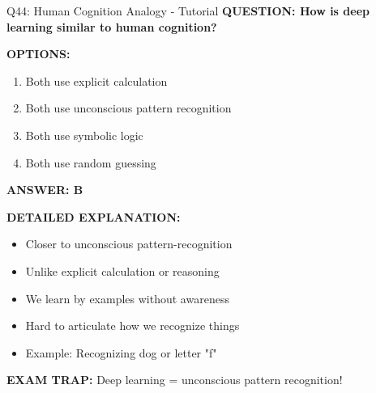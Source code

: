 \documentclass[8pt]{beamer}
\begin{document}
	\begin{frame}{Q44: Human Cognition Analogy - Tutorial}
		\fontsize{6.5}{7.5}\selectfont
		\textbf{QUESTION: How is deep learning similar to human cognition?}
		
		\vspace{0.1cm}
		\textbf{OPTIONS:}
		\begin{enumerate}
			\item Both use explicit calculation
			\item Both use unconscious pattern recognition
			\item Both use symbolic logic
			\item Both use random guessing
		\end{enumerate}
		
		\vspace{0.1cm}
		\textcolor{myblue}{\textbf{ANSWER: B}}
		
		\vspace{0.1cm}
		\textbf{DETAILED EXPLANATION:}
		\begin{itemize}
			\item Closer to unconscious pattern-recognition
			\item Unlike explicit calculation or reasoning
			\item We learn by examples without awareness
			\item Hard to articulate how we recognize things
			\item Example: Recognizing dog or letter "f"
		\end{itemize}
		
		\vspace{0.1cm}
		\textcolor{myred}{\textbf{EXAM TRAP:}} Deep learning = \textcolor{myblue}{unconscious pattern recognition}!
	\end{frame}
	
\end{document}

